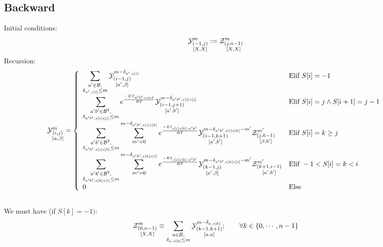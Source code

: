 \documentclass[11pt]{article} %
\begin{document}
\subsection{Backward}	
Initial conditions:
$$
	\Y{-1,j}{m}{X,X}:=
		\displaystyle
	  \Z{j,n-1}{m}{X,X}
$$
Recursion:
$$
	\Y{i,j}{m}{\alpha,\beta} = \left\{
  \begin{array}{ll}
		\displaystyle
    \sum_{\substack{a'\in \B,\\ \Kron_{a',s[i]}\le m}}
    \Y{i-1,j}{m- \Kron_{a',s[i]}}{a',\beta} &
    \text{Elif }S[i]=-1 \\
    \displaystyle
    \sum_{\substack{a'b'\in \B^2,\\ \Kron_{a'b',s[i]s[j]}\le m}}
		 e^{\frac{-ES_{ a' b' \to \alpha \beta }}{RT}}
    \Y{i-1,j+1}{m- \Kron_{a'b',s[i]s[j]}}{a',b'} &
   	 \text{Elif }S{[i]}=j \land S{[i+1]}=j-1\\
		 \displaystyle
		 \sum_{\substack{a'b'\in \B^2,\\ \Kron_{a'b',s[i]s[k]}\le m}}
		 \sum_{m'=0}^{m-\Kron_{a'b',s[i]s[k]}}
  		 e^{\frac{-EI_{s[i]s[k],a'b'}}{RT}}
		 \Y{i-1,k+1}{m- \Kron_{a'b',s[i]s[k]} - m'}{a',b'}
     \Z{j,k-1}{m'}{\beta,b'} &
		 \text{Elif }S{[i]}=k \geq j\\
		 \displaystyle
		 \sum_{\substack{a'b'\in \B^2,\\ \Kron_{a'b',s[k]s[i]}\le m}}
		 \sum_{m'=0}^{m-\Kron_{a'b',s[k]s[i]}}
  		 e^{\frac{-EI_{s[i]s[k],a'b'}}{RT}}
		 \Y{k-1,j}{m- \Kron_{a'b',s[k]s[i]} - m'}{a',\beta}
     \Z{k+1,i-1}{m'}{a',b'} &
		 \text{Elif }-1 < S{[i]}=k < i\\
		 0 & \text{Else}
  \end{array}\right.
$$
\subsection*{}
We must have (if $S[k] = -1)$:
$$
	\Z{0,n-1}{m}{X,X} \equiv     
	\sum_{\substack{a\in \B,\\ \Kron_{a,s[k]}\le m}}	
	\Y{k-1,k+1}{m-\Kron_{a,s[k]}}{a,a};\qquad
	\forall k \in \{0,\cdots,n-1\}
$$
\end{document}
